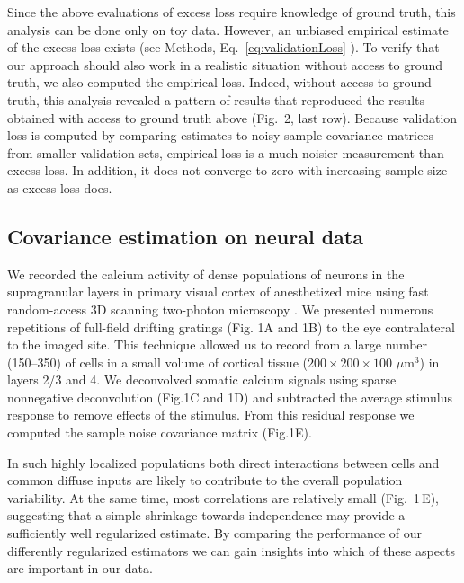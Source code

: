 Since the above evaluations of excess loss require knowledge of ground truth, this analysis can be done only on toy data. However, an unbiased empirical estimate of the excess loss exists (see Methods, Eq.~\ref{eq:validationLoss} ).  To verify that our approach should also work in a realistic situation without access to ground truth, we also computed the empirical loss. Indeed, without access to ground truth, this analysis revealed a pattern of results that reproduced the results obtained with access to ground truth above (Fig.~2, last row). Because validation loss is computed by comparing estimates to noisy sample covariance matrices from smaller validation sets, empirical loss is a much noisier measurement than excess loss. In addition, it does not converge to zero with increasing sample size as excess loss does.




\subsection*{Covariance estimation on neural data}


We recorded the calcium activity of dense populations of neurons in the supragranular layers in primary visual cortex of anesthetized mice using fast random-access 3D scanning two-photon microscopy \cite{Stosiek:2003,Reddy:2005}. We presented numerous repetitions of full-field drifting gratings (Fig. 1A and 1B) to the eye contralateral to the imaged site. This technique allowed us to record from a large number (150--350) of cells in a small volume of cortical tissue ($200\times200\times100$ $\mu$m$^3$) in layers 2/3 and 4. We deconvolved somatic calcium signals using sparse nonnegative deconvolution \cite{Vogelstein:2010} (Fig.\;1C and 1D) and subtracted the average stimulus response to remove effects of the stimulus. From this residual response we computed the sample noise covariance matrix (Fig.\;1E).

In such highly localized populations both direct interactions between cells and common diffuse inputs are likely to contribute to the overall population variability. At the same time, most correlations are relatively small (Fig.~1\,E), suggesting that a simple shrinkage towards independence may provide a sufficiently well regularized estimate. By comparing the performance of our differently regularized estimators we can gain insights into which of these aspects are important in our data.

